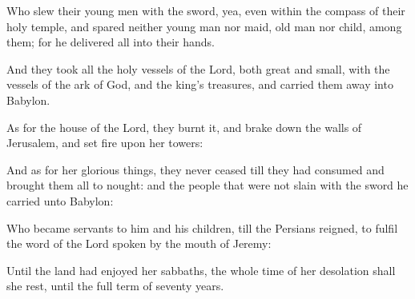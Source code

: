 {\par }{\PP {}Who slew their young men with the sword, yea, even within the compass of their holy temple, and spared neither young man nor maid, old man nor child, among them; for he delivered all into their hands.
\par }{\PP {}And they took all the holy vessels of the Lord, both great and small, with the vessels of the ark of God, and the king’s treasures, and carried them away into Babylon.
\par }{\PP {}As for the house of the Lord, they burnt it, and brake down the walls of Jerusalem, and set fire upon her towers:
\par }{\PP {}And as for her glorious things, they never ceased till they had consumed and brought them all to nought: and the people that were not slain with the sword he carried unto Babylon:
\par }{\PP {}Who became servants to him and his children, till the Persians reigned, to fulfil the word of the Lord spoken by the mouth of Jeremy:
\par }{\PP {}Until the land had enjoyed her sabbaths, the whole time of her desolation shall she rest, until the full term of seventy years.

}
